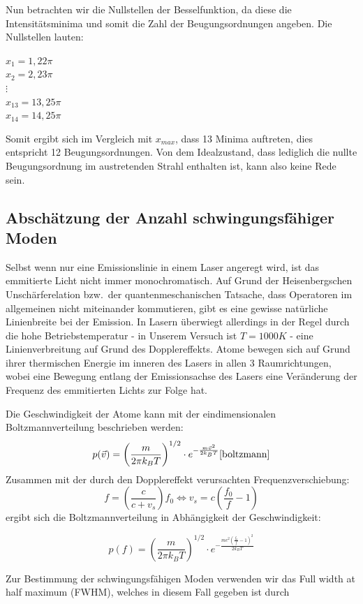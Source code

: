 \documentclass[bigchapter,colorback,accentcolor=tud4b,linedtoc,11pt]{tudreport}
\begin{document}
Nun betrachten wir die Nullstellen der Besselfunktion, da diese die Intensitätsminima und somit die Zahl der Beugungsordnungen angeben. Die Nullstellen lauten: 

\begin{center}
$x_1 = 1,22 \pi$     \\
$x_2 = 2,23 \pi$     \\
$\vdots$             \\
$x_{13} = 13,25 \pi$ \\
$x_{14} = 14,25 \pi$
\end{center}

Somit ergibt sich im Vergleich mit $x_{max}$, dass 13 Minima auftreten, dies entspricht 12 Beugungsordnungen. Von dem Idealzustand, dass lediglich die nullte Beugungsordnung im austretenden Strahl enthalten ist, kann also keine Rede sein.

\subsection{Abschätzung der Anzahl schwingungsfähiger Moden}
Selbst wenn nur eine Emissionslinie in einem Laser angeregt wird, ist das
emmitierte Licht nicht immer monochromatisch. Auf Grund der Heisenbergschen
Unschärferelation bzw.\ der quantenmeschanischen Tatsache, dass Operatoren im
allgemeinen nicht miteinander kommutieren, gibt es eine gewisse natürliche
Linienbreite bei der Emission. In Lasern überwiegt allerdings in der Regel durch
die hohe Betriebstemperatur - in Unserem Versuch ist $T = 1000K$ - eine
Linienverbreitung auf Grund des Dopplereffekts. Atome bewegen sich auf Grund
ihrer thermischen Energie im inneren des Lasers in allen 3 Raumrichtungen, wobei
eine Bewegung entlang der Emissionsachse des Lasers eine Veränderung der
Frequenz des emmitierten Lichts zur Folge hat.

Die Geschwindigkeit der Atome kann mit der eindimensionalen Boltzmannverteilung
beschrieben werden:
$$p(\vec{v}) = \left(\frac{m}{2\pi k_B T}\right)^{1/2} \cdot e^{-\frac{m
    \vec{v}^2}{2k_B T}} \cite{boltzmann}$$
Zusammen mit der durch den Dopplereffekt verursachten Frequenzverschiebung:
$$f = \left ( \frac {c}{c + v_{s}} \right ) f_0 \Leftrightarrow v_s=c\left( \frac{f_0}{f}-1 \right)$$
ergibt sich die Boltzmannverteilung in Abhängigkeit der Geschwindigkeit:

$$p(f) = \left(\frac{m}{2\pi k_B T}\right)^{1/2} \cdot e^{-\frac{m
    c^2\left( \frac{f_0}{f}-1 \right)^2}{2k_B T}}$$

Zur Bestimmung der schwingungsfähigen Moden verwenden wir das Full width at half
maximum (FWHM), welches in diesem Fall gegeben ist durch 
\end{document}
